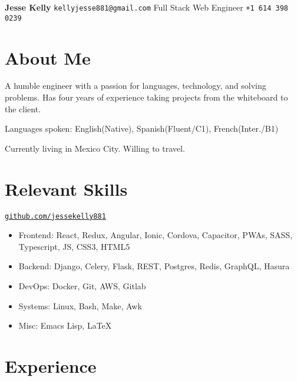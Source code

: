 \documentclass[letterpaper,11pt]{article}
\begin{document}
\begin{flushleft}
\Large{\textbf{Jesse Kelly}}
\hfill
\texttt{kellyjesse881@gmail.com}
\newline
Full Stack Web Engineer
\hfill
\texttt{+1 614 398 0239}
\end{flushleft}

\section{About Me}
A humble engineer with a passion for languages, technology, and solving problems.
Has four years of experience taking projects from the whiteboard to the client.

\vspace{2mm}
Languages spoken: English(Native), Spanish(Fluent/C1), French(Inter./B1)

\vspace{2mm}
Currently living in Mexico City. Willing to travel.


\section{Relevant Skills}
\href{https://github.com/jessekelly881}{\texttt{github.com/jessekelly881}}
\begin{itemize}
\setlength\itemsep{0em}
\item Frontend: React, Redux, Angular, Ionic, Cordova, Capacitor, PWAs, SASS, Typescript, JS, CSS3, HTML5
\item Backend: Django, Celery, Flask, REST, Postgres, Redis, GraphQL, Hasura
\item DevOps: Docker, Git, AWS, Gitlab
\item Systems: Linux, Bash, Make, Awk
\item Misc: Emacs Lisp, \LaTeX
\end{itemize}

\section{Experience}
\end{document}
